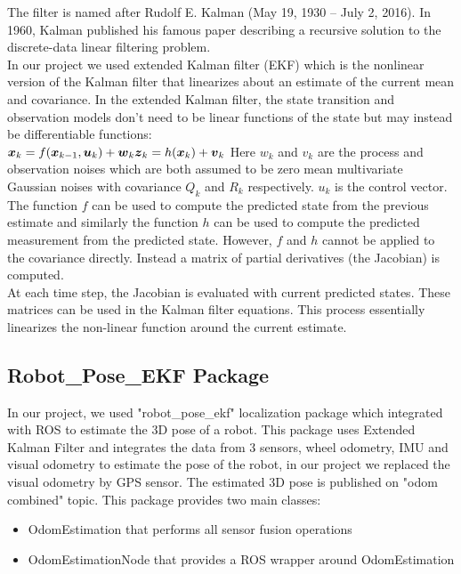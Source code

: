 The filter is named after Rudolf E. Kalman (May 19, 1930 – July 2, 2016). In 1960, Kalman published his famous paper describing a recursive solution to the discrete-data linear filtering problem. \cite{kalmanFilter}\\

In our project we used extended Kalman filter (EKF) which is the nonlinear version of the Kalman filter that linearizes about an estimate of the current mean and covariance. In the extended Kalman filter, the state transition and observation models don't need to be linear functions of the state but may instead be differentiable functions:\\
     ${\displaystyle {\boldsymbol {x}}_{k}=f({\boldsymbol {x}}_{k-1},{\boldsymbol {u}}_{k})+{\boldsymbol {w}}_{k}} \\
   {\displaystyle {\boldsymbol {z}}_{k}=h({\boldsymbol {x}}_{k})+{\boldsymbol {v}}_{k}} \\ $
Here $w_k$ and $v_k$ are the process and observation noises which are both assumed to be zero mean multivariate Gaussian noises with covariance $Q_k$ and $R_k$ respectively. $u_k$ is the control vector.
The function $f$ can be used to compute the predicted state from the previous estimate and similarly the function $h$ can be used to compute the predicted measurement from the predicted state. However, $f$ and $h$ cannot be applied to the covariance directly. Instead a matrix of partial derivatives (the Jacobian) is computed.\\
At each time step, the Jacobian is evaluated with current predicted states. These matrices can be used in the Kalman filter equations. This process essentially linearizes the non-linear function around the current estimate.\cite{extendedKalmanFilter}\\


\subsection {Robot\_Pose\_EKF Package}

\hspace{2cm} In our project, we used "robot\_pose\_ekf" localization package which integrated with ROS to estimate the 3D pose of a robot. This package uses Extended Kalman Filter and integrates the data from 3 sensors,
 wheel odometry, IMU and visual odometry to estimate the pose of the robot, in our project we replaced the visual odometry by GPS sensor. The estimated 3D pose is published on "odom combined" topic.
This package provides two main classes: 
 \begin{itemize}
\item OdomEstimation that performs all sensor fusion operations
\item OdomEstimationNode that provides a ROS wrapper around OdomEstimation
\end{itemize}

